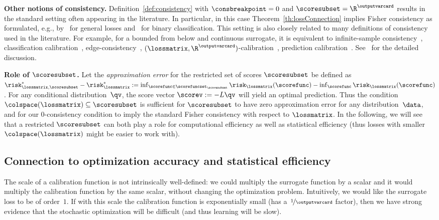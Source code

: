 \documentclass{article}
\begin{document}
%



%
\textbf{Other notions of consistency.}
Definition~\ref{def:consistency} with $\consbreakpoint = 0$ and $\scoresubset = \R^\outputvarcard$ results in the standard setting often appearing in the literature. In particular, in this case Theorem~\ref{th:lossConnection} implies Fisher consistency as formulated, e.g., by~\citet{pedregosa15ordivalreg} for general losses and~\citet{lin04} for binary classification.
This setting is also closely related to many definitions of consistency used in the literature.
For example, for a bounded from below and continuous surrogate, it is equivalent to infinite-sample consistency~\citep{zhang04}, classification calibration~\citep{tewari07}, edge-consistency~\citep{duchi10}, $(\lossmatrix, \R^\outputvarcard)$-calibration~\citep{ramaswamy16calibrDim}, prediction calibration~\citep{williamson16}.
See~\citep[Appendix~A]{zhang04} for the detailed discussion.

\textbf{Role of $\scoresubset$.} Let the \emph{approximation error} for the restricted set of scores $\scoresubset$ be defined as $\risk_{\lossmatrix,\scoresubset}^* - \risk_{\lossmatrix}^* := \inf_{\scorefunc \in \scorefuncset_\scoresubset} \risk_\lossmatrix (\scorefunc) - \inf_{\scorefunc} \risk_\lossmatrix (\scorefunc)$. %
For any conditional distribution~$\qv$, the score vector $\scorev := -L\qv$ will yield an optimal prediction. Thus the condition $\colspace(\lossmatrix) \subseteq \scoresubset$ is sufficient for $\scoresubset$ to have zero approximation error for any distribution~$\data$, and for our $0$-consistency condition to imply the standard Fisher consistency with respect to $\lossmatrix$. In the following, we will see that a restricted $\scoresubset$ can both play a role for computational efficiency as well as statistical efficiency (thus losses with smaller $\colspace(\lossmatrix)$ might be easier to work with). 

%
%
%
%
%
%
%
%
%
%
%



%


\subsection{Connection to optimization accuracy and statistical efficiency}
\label{sec:connection}
The scale of a calibration function is not intrinsically well-defined: we could multiply the surrogate function by a scalar and it would multiply the calibration function by the same scalar, without changing the optimization problem.
Intuitively, we would like the surrogate loss to be of order~$1$.
If with this scale the calibration function is exponentially small (has a~$\nicefrac{1}{\outputvarcard}$ factor), then we have strong evidence that the stochastic optimization will be difficult (and thus learning will be slow).
\end{document}
